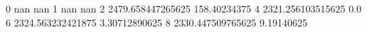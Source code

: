 0 nan nan
1 nan nan
2 2479.658447265625 158.40234375
4 2321.256103515625 0.0
6 2324.563232421875 3.30712890625
8 2330.447509765625 9.19140625
